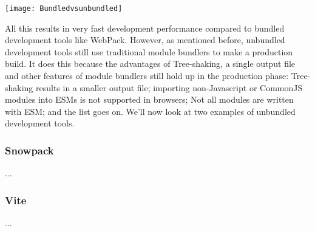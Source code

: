 \texttt{[image: Bundledvsunbundled]}

All this results in very fast development performance compared to bundled development tools like WebPack. However, as mentioned before, unbundled development tools still use traditional module bundlers to make a production build. It does this because the advantages of Tree-shaking, a single output file and other features of module bundlers still hold up in the production phase: Tree-shaking results in a smaller output file; importing non-Javascript or CommonJS modules into ESMs is not supported in browsers; Not all modules are written with ESM; and the list goes on. We’ll now look at two examples of unbundled development tools.

\subsubsection{Snowpack}
...
\subsubsection{Vite}
...
